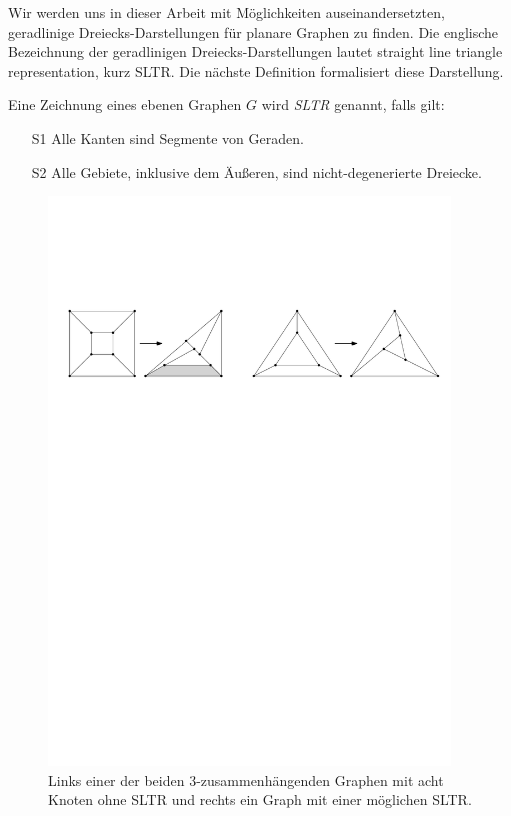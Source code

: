 Wir werden uns in dieser Arbeit mit Möglichkeiten auseinandersetzten, geradlinige Dreiecks-Darstellungen für planare Graphen zu finden. Die englische Bezeichnung der geradlinigen Dreiecks-Darstellungen lautet straight line triangle representation, kurz SLTR. Die nächste Definition formalisiert diese Darstellung.

\begin{definition}[SLTR]\label{defsltr}
Eine Zeichnung eines ebenen Graphen $G$ wird \textit{SLTR} genannt, falls gilt:
\begin{itemize}
\item[S1] Alle Kanten sind Segmente von Geraden.
\item[S2] Alle Gebiete, inklusive dem Äußeren, sind nicht-degenerierte Dreiecke.
\end{itemize}
\end{definition}

\begin{figure}[h]
	\centering
  \includegraphics[width=0.95\textwidth]{sltr-example.pdf}
	\caption{Links einer der beiden 3-zusammenhängenden Graphen mit acht Knoten ohne SLTR und rechts ein Graph mit einer möglichen SLTR.}
\end{figure}

